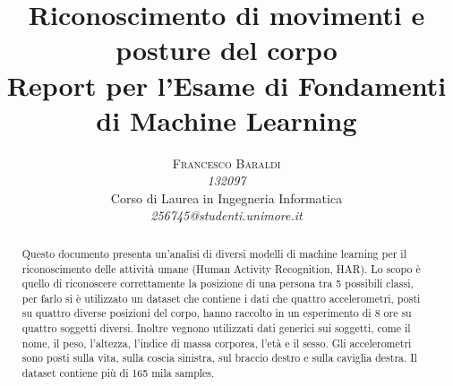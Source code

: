 \documentclass[10pt,a4paper]{article}
\begin{document}
\title{Riconoscimento di movimenti e posture del corpo \\
\Large{Report per l'Esame di Fondamenti di Machine Learning}
} %

\author{\textsc{Francesco Baraldi} \\
    \emph{132097} \\
    Corso di Laurea in Ingegneria Informatica\\
    \emph{256745@studenti.unimore.it}
  }

\date{}

\maketitle %

\begin{abstract}
\normalsize
Questo documento presenta un'analisi di diversi modelli di machine learning per il riconoscimento delle attività umane (Human Activity Recognition, HAR). Lo scopo è quello di riconoscere correttamente la posizione di una persona tra 5 possibili classi, per farlo si è utilizzato un dataset che contiene i dati che quattro accelerometri, posti su quattro diverse posizioni del corpo, hanno raccolto in un esperimento di 8 ore su quattro soggetti diversi. Inoltre vegnono utilizzati dati generici sui soggetti, come il nome, il peso, l'altezza, l'indice di massa corporea, l'età e il sesso. Gli accelerometri sono posti sulla vita, sulla coscia sinistra, sul braccio destro e sulla caviglia destra. Il dataset contiene più di 165 mila samples.

\end{abstract}







%
\appendix
\printbibliography[heading=bibintoc]
\end{document}

